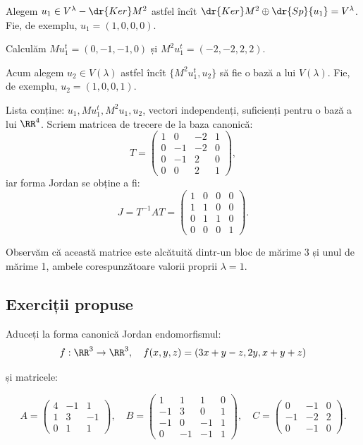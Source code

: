 Alegem $ u_1 \in V^\lambda - \dr{Ker}M^2 $ astfel încît
$ \dr{Ker}M^2 \oplus \dr{Sp} \{ u_1 \} = V^\lambda $.
Fie, de exemplu, $ u_1 = (1, 0, 0, 0) $.

Calculăm $ Mu_1^t = (0, -1, -1, 0) $ și $ M^2u_1^t = (-2, -2, 2, 2) $.

Acum alegem $ u_2 \in V(\lambda) $ astfel încît $ \{ M^2u_1^t, u_2 \} $ să
fie o bază a lui $ V(\lambda) $. Fie, de exemplu, $ u_2 = (1, 0, 0, 1) $.

Lista conține: $ u_1, Mu_1^t, M^2u_1, u_2 $, vectori independenți, suficienți
pentru o bază a lui $ \RR^4 $. Scriem matricea de trecere de la baza canonică:
\[
  T = \begin{pmatrix}
    1 & 0 & -2 & 1 \\
    0 & -1 & -2 & 0 \\
    0 & -1 & 2 & 0 \\
    0 & 0 & 2 & 1
  \end{pmatrix},
\]
iar forma Jordan se obține a fi:
\[
  J = T^{-1} AT = \begin{pmatrix}
    1 & 0 & 0 & 0 \\
    1 & 1 & 0 & 0 \\
    0 & 1 & 1 & 0 \\
    0 & 0 & 0 & 1
  \end{pmatrix}.
\]

Observăm că această matrice este alcătuită dintr-un bloc de mărime 3 și unul
de mărime 1, ambele corespunzătoare valorii proprii $ \lambda = 1 $.


\subsection{Exerciții propuse}


Aduceți la forma canonică Jordan endomorfismul:
\[
  f : \RR^3 \to \RR^3, \quad f(x, y, z) = (3x + y - z, 2y, x + y + z)
\]

și matricele:

\[
  A = \begin{pmatrix}
    4 & -1 & 1 \\
    1 & 3 & -1 \\
    0 & 1 & 1
  \end{pmatrix}, \quad
  B =
  \begin{pmatrix}
    1 & 1 & 1 & 0 \\
    -1 & 3 & 0 & 1 \\
    -1 & 0 & -1 & 1 \\
    0 & -1 & -1 & 1
  \end{pmatrix}, \quad
  C =
  \begin{pmatrix}
    0 & -1 & 0 \\
    -1 & -2 & 2 \\
    0 & -1 & 0
  \end{pmatrix}.
\]

